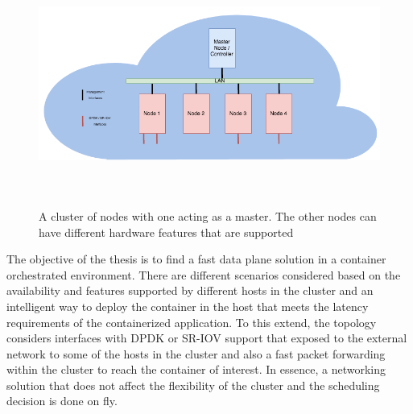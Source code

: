 \documentclass[english, 12pt, a4paper, elec, utf8, a-1b, online]{aaltothesis}
\begin{document}
\begin{figure}[htb]
\begin{center}
\includegraphics[height=8cm,width=15cm]{pics/ClusterDiag.png}
\end{center}
\caption{A cluster of nodes with one acting as a master. The other nodes can have different hardware features that are supported}
\label{fig-intro}
\end{figure}

The objective of the thesis is to find a fast data plane solution in a container orchestrated environment. There are different scenarios considered based on the availability and features supported by different hosts in the cluster and an intelligent way to deploy the container in the host that meets the latency requirements of the containerized application. To this extend, the topology considers interfaces with DPDK or SR-IOV support that exposed to the external network to some of the hosts in the cluster and also a fast packet forwarding within the cluster to reach the container of interest. In essence, a networking solution that does not affect the flexibility of the cluster and the scheduling decision is done on fly. 

\end{document}
